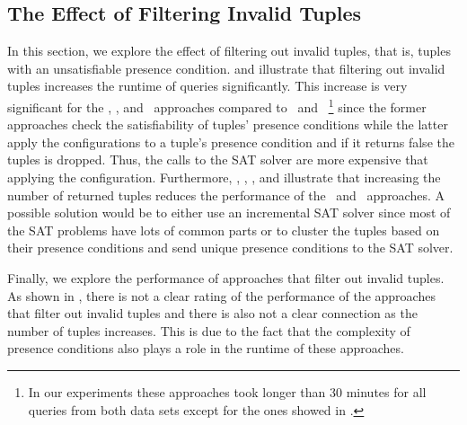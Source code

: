 \subsection{The Effect of Filtering Invalid Tuples}
\label{sec:exp-tuples}

In this section, we explore the effect of filtering out invalid tuples, that is, tuples with
an unsatisfiable presence condition.  and 
illustrate that filtering out invalid tuples increases the runtime of queries significantly. 
%
This increase is very significant for the \ubf, \ubfi, and \uav\ approaches compared to
\nbf\ and \nbfi\ 
\footnote{In our experiments these approaches took longer than 30 minutes for 
all queries from both data sets except for the ones showed in .
}
since the former approaches check the satisfiability of tuples' 
presence conditions while the latter apply the configurations to a tuple's 
presence condition and if it returns false the tuples is dropped. Thus,
the calls to the SAT solver are more expensive that applying the configuration.
%
Furthermore, , , 
\figref{emp-nbfi-tuple}, and \figref{emp-nbf-tuple} illustrate that increasing the number of 
returned tuples reduces the performance of the \nbf\ and \nbfi\ approaches. 
%
A possible solution would be to either use an incremental SAT solver since most of the
SAT problems have lots of common parts or to cluster the tuples based on their presence
conditions and send unique presence conditions to the SAT solver. 

Finally, we explore the performance of approaches that filter out invalid tuples. 
As shown in \figref{filter-comp}, there is not a clear rating of
the performance of the approaches that filter out invalid tuples and there is also
not a clear connection as the number of tuples increases. This is due to the fact that 
the complexity of presence conditions also plays a role in the runtime of these approaches. 

